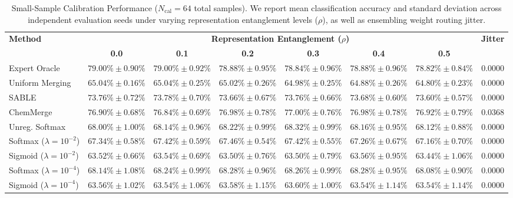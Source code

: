 \begin{table}[t]
\caption{Small-Sample Calibration Performance ($N_{\text{cal}} = 64$ total samples). We report mean classification accuracy and standard deviation across independent evaluation seeds under varying representation entanglement levels ($\rho$), as well as ensembling weight routing jitter.}
\label{tab:small_sample}
\vskip 0.15in
\begin{center}
\begin{scriptsize}
\begin{sc}
\setlength{\tabcolsep}{2.2pt}
\begin{tabular}{lccccccc}
\toprule
\textbf{Method} & \multicolumn{6}{c}{\textbf{Representation Entanglement ($\rho$)}} & \textbf{Jitter} \\
\cmidrule(lr){2-7}
& \textbf{0.0} & \textbf{0.1} & \textbf{0.2} & \textbf{0.3} & \textbf{0.4} & \textbf{0.5} & \\
\midrule
Expert Oracle & $79.00\% \pm 0.90\%$ & $79.00\% \pm 0.92\%$ & $78.88\% \pm 0.95\%$ & $78.84\% \pm 0.96\%$ & $78.88\% \pm 0.96\%$ & $78.82\% \pm 0.84\%$ & $0.0000$ \\
Uniform Merging & $65.04\% \pm 0.16\%$ & $65.04\% \pm 0.25\%$ & $65.02\% \pm 0.26\%$ & $64.98\% \pm 0.25\%$ & $64.88\% \pm 0.26\%$ & $64.80\% \pm 0.23\%$ & $0.0000$ \\
SABLE & $73.76\% \pm 0.72\%$ & $73.78\% \pm 0.70\%$ & $73.66\% \pm 0.67\%$ & $73.76\% \pm 0.66\%$ & $73.68\% \pm 0.60\%$ & $73.60\% \pm 0.57\%$ & $0.0000$ \\
ChemMerge & $76.90\% \pm 0.68\%$ & $76.84\% \pm 0.69\%$ & $76.98\% \pm 0.78\%$ & $77.00\% \pm 0.76\%$ & $76.98\% \pm 0.78\%$ & $76.92\% \pm 0.79\%$ & $0.0368$ \\
\midrule
Unreg. Softmax & $68.00\% \pm 1.00\%$ & $68.14\% \pm 0.96\%$ & $68.22\% \pm 0.99\%$ & $68.32\% \pm 0.99\%$ & $68.16\% \pm 0.95\%$ & $68.12\% \pm 0.88\%$ & $0.0000$ \\
Softmax ($\lambda=10^{-2}$) & $67.34\% \pm 0.58\%$ & $67.42\% \pm 0.59\%$ & $67.46\% \pm 0.54\%$ & $67.42\% \pm 0.55\%$ & $67.26\% \pm 0.67\%$ & $67.16\% \pm 0.70\%$ & $0.0000$ \\
Sigmoid ($\lambda=10^{-2}$) & $63.52\% \pm 0.66\%$ & $63.54\% \pm 0.69\%$ & $63.50\% \pm 0.76\%$ & $63.50\% \pm 0.79\%$ & $63.56\% \pm 0.95\%$ & $63.44\% \pm 1.06\%$ & $0.0000$ \\
Softmax ($\lambda=10^{-4}$) & $68.14\% \pm 1.08\%$ & $68.24\% \pm 0.99\%$ & $68.28\% \pm 0.96\%$ & $68.26\% \pm 0.99\%$ & $68.28\% \pm 0.95\%$ & $68.08\% \pm 0.90\%$ & $0.0000$ \\
Sigmoid ($\lambda=10^{-4}$) & $63.56\% \pm 1.02\%$ & $63.54\% \pm 1.06\%$ & $63.58\% \pm 1.15\%$ & $63.60\% \pm 1.00\%$ & $63.54\% \pm 1.14\%$ & $63.54\% \pm 1.14\%$ & $0.0000$ \\
\bottomrule
\end{tabular}
\end{sc}
\end{scriptsize}
\end{center}
\vskip -0.1in
\end{table}

